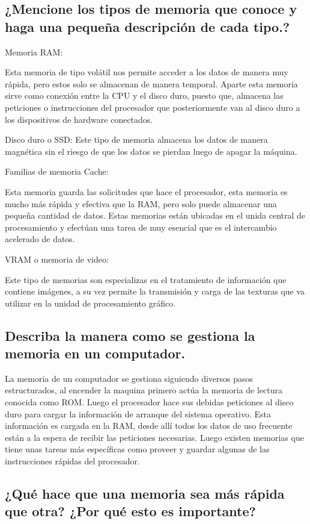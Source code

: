 \documentclass{article}
\begin{document}
\subsection{¿Mencione los tipos de memoria que conoce y haga una pequeña descripción de cada tipo.?}
Memoria RAM: 

Esta memoria de tipo volátil nos permite acceder a los datos de manera muy rápida, pero estos solo se almacenan de manera temporal. Aparte esta memoria sirve como conexión entre la CPU y el disco duro, puesto que, almacena las peticiones o instrucciones del procesador que posteriormente van al disco duro a los dispositivos de hardware conectados. 

Disco duro o SSD: 
Este tipo de memoria almacena los datos de manera magnética sin el riesgo de que los datos se pierdan luego de apagar la máquina. 

Familias de memoria Cache: 

Esta memoria guarda las solicitudes que hace el procesador, esta memoria es mucho más rápida y efectiva que la RAM, pero solo puede almacenar una pequeña cantidad de datos. Estas memorias están ubicadas en el unida central de procesamiento y efectúan una tarea de muy esencial que es el intercambio acelerado de datos. 

VRAM o memoria de video:  

Este tipo de memorias son especializas en el tratamiento de información que contiene imágenes, a su vez permite la transmisión y carga de las texturas que va utilizar en la unidad de procesamiento gráfico. 



\subsection{Describa la manera como se gestiona la memoria en un computador.} 

La memoria de un computador se gestiona siguiendo diversos pasos estructurados, al encender la maquina primero actúa la memoria de lectura conocida como ROM. Luego el procesador hace sus debidas peticiones al disco duro para cargar la información de arranque del sistema operativo. Esta información es cargada en la RAM, desde allí todos los datos de uso frecuente están a la espera de recibir las peticiones necesarias. Luego existen memorias que tiene unas tareas más específicas como proveer y guardar algunas de las instrucciones rápidas del procesador. 

\subsection{¿Qué hace que una memoria sea más rápida que otra? ¿Por qué esto es importante?}
\end{document}
